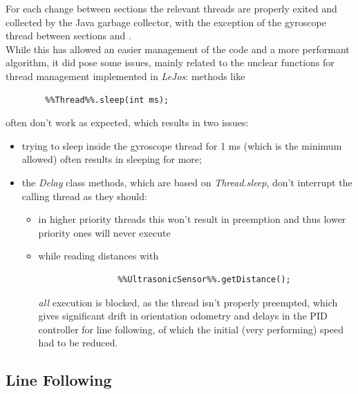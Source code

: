 \documentclass[a4paper,11pt,oneside]{book}
\newcommand{\RNum}[1]{\uppercase\expandafter{\romannumeral #1\relax}}
\begin{document}
		For each change between sections the relevant threads are properly exited and collected by the Java garbage collector, with the exception of the gyroscope thread between sections \RNum{2} and \RNum{3}.\\
		
		While this has allowed an easier management of the code and a more performant algorithm, it did pose some issues, mainly related to the unclear functions for thread management implemented in \textit{LeJos}: methods like
		\begin{lstlisting}
		%%Thread%%.sleep(int ms);
		\end{lstlisting}
		often don't work as expected, which results in two issues:
		\begin{itemize}
			\item trying to sleep inside the gyroscope thread for 1 ms (which is the minimum allowed) often results in sleeping for more;
			\item the \textit{Delay} class methods, which are based on \textit{Thread.sleep}, don't interrupt the calling thread as they should:
				\begin{itemize}
				\item in higher priority threads this won't result in preemption and thus lower priority ones will never execute
				\item while reading distances with 
				\begin{lstlisting}
				%%UltrasonicSensor%%.getDistance();
				\end{lstlisting}
				\emph{all} execution is blocked, as the thread isn't properly preempted, which gives significant drift in orientation odometry and delays in the PID controller for line following, of which the initial (very performing) speed had to be reduced.
			\end{itemize}
				
		
		\end{itemize}
		
		
		\subsection {Line Following}
		
\end{document}
